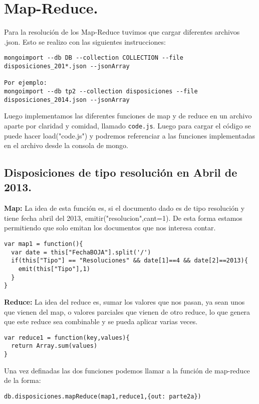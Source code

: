 \section{Map-Reduce.}
Para la resolución de los Map-Reduce tuvimos que cargar diferentes archivos .json. Esto se realizo con las siguientes instrucciones:
\begin{lstlisting}
mongoimport --db DB --collection COLLECTION --file
disposiciones_201*.json --jsonArray

Por ejemplo:
mongoimport --db tp2 --collection disposiciones --file
disposiciones_2014.json --jsonArray
\end{lstlisting}

Luego implementamos las diferentes funciones de map y de reduce en un archivo aparte por claridad y comidad, llamado \texttt{code.js}.
Luego para cargar el código se puede hacer load("code.js") y podremos referenciar a las funciones implementadas en el archivo desde la consola de mongo.

\subsection{Disposiciones de tipo resolución en Abril de 2013.}
\textbf{Map:}
La idea de esta función es, si el documento dado es de tipo resolución y tiene fecha abril del 2013,
emitir("resolucion",cant=1). De esta forma estamos permitiendo que solo emitan los documentos que nos
interesa contar.

\begin{lstlisting}
var map1 = function(){
  var date = this["FechaBOJA"].split('/')
  if(this["Tipo"] == "Resoluciones" && date[1]==4 && date[2]==2013){
    emit(this["Tipo"],1)
  }
}
\end{lstlisting}

\textbf{Reduce:}
La idea del reduce es, sumar los valores que nos pasan, ya sean unos que vienen del map,
o valores parciales que vienen de otro reduce, lo que genera que este reduce sea combinable y se pueda
aplicar varias veces.

\begin{lstlisting}
var reduce1 = function(key,values){
  return Array.sum(values)
}
\end{lstlisting}

Una vez definadas las dos funciones podemos llamar a la función de map-reduce de la forma:
\begin{lstlisting}
db.disposiciones.mapReduce(map1,reduce1,{out: parte2a})
\end{lstlisting}

